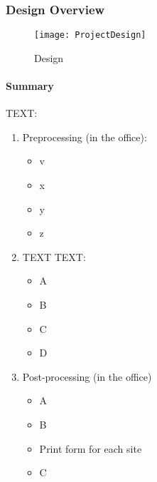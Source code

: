 \subsubsection{Design Overview}
\vspace{-.2in}

\begin{figure}[h!]
\centering
    \texttt{[image: ProjectDesign]}
\vspace{-.2in}

\caption{Design}
\end{figure}
\clearpage
\paragraph{Summary}
\vspace{.25in}

TEXT:
\begin{enumerate}
\item \Large Preprocessing \normalsize(in the office):
\begin{itemize}
\item v
\item x
\item y
\item z
\end{itemize}
\item \Large TEXT \normalsize TEXT:
\begin{itemize}
\item A
\item B
\item C
\item D
\end{itemize}
\item \Large Post-processing \normalsize (in the office)
\begin{itemize}
\item A
\item B
\item Print form for each site
\item C
\end{itemize}
\end{enumerate}
\clearpage

